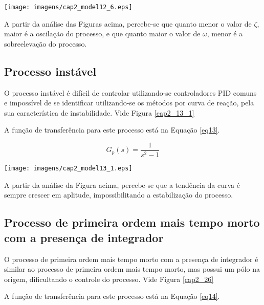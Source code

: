     \begin{center}
        \texttt{[image: imagens/cap2\_model12\_6.eps]}
	\label{cap2_12_6}
    \end{center}

    A partir da análise das Figuras acima, percebe-se que quanto menor o valor de
    $\zeta$, maior é a oscilação do processo, e que quanto maior o valor de $\omega$,
    menor é a sobreelevação do processo.

\subsection{Processo instável}
    
    O processo instável é difícil de controlar utilizando-se controladores \ac{PID}
    comuns e impossível de se identificar utilizando-se os métodos por curva de
    reação, pela sua característica de instabilidade. Vide Figura \ref{cap2_13_1}
   
    A função de transferência para este processo está na Equação \ref{eq13}.

    \begin{equation}
        \label{eq13}
        G_p(s) = \frac{1}{s^2 - 1}
    \end{equation}
    
    \begin{center}
        \texttt{[image: imagens/cap2\_model13\_1.eps]}
	\label{cap2_13_1}
    \end{center}

    A partir da análise da Figura acima, percebe-se que a tendência da curva é sempre
    crescer em aplitude, impossibilitando a estabilização do processo.

\subsection{Processo de primeira ordem mais tempo morto com a presença de integrador}
    
    O processo de primeira ordem mais tempo morto com a presença de integrador é
    similar ao processo de primeira ordem mais tempo morto, mas possui um pólo
    na origem, dificultando o controle do processo. Vide Figura \ref{cap2_26}
    
    A função de transferência para este processo está na Equação \ref{eq14}.

